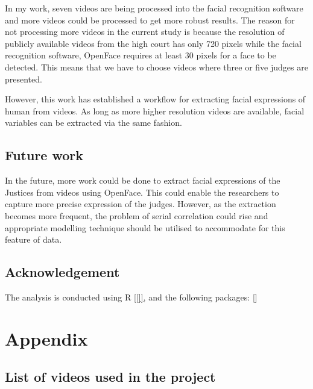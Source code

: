 \documentclass{monashthesis}
\begin{document}
In my work, seven videos are being processed into the facial recognition software and more videos could be processed to get more robust results. The reason for not processing more videos in the current study is because the resolution of publicly available videos from the high court has only 720 pixels while the facial recognition software, OpenFace requires at least 30 pixels for a face to be detected. This means that we have to choose videos where three or five judges are presented.

However, this work has established a workflow for extracting facial expressions of human from videos. As long as more higher resolution videos are available, facial variables can be extracted via the same fashion.

\hypertarget{future-work}{%
\section{Future work}\label{future-work}}

In the future, more work could be done to extract facial expressions of the Justices from videos using OpenFace. This could enable the researchers to capture more precise expression of the judges. However, as the extraction becomes more frequent, the problem of serial correlation could rise and appropriate modelling technique should be utilised to accommodate for this feature of data.

\hypertarget{acknowledgement}{%
\section{Acknowledgement}\label{acknowledgement}}

The analysis is conducted using R {[}\ref{]}, and the following packages: {[}{]}

\appendix

\hypertarget{appendix}{%
\chapter{Appendix}\label{appendix}}

\hypertarget{list-of-videos-used-in-the-project}{%
\section{List of videos used in the project}\label{list-of-videos-used-in-the-project}}
\end{document}
